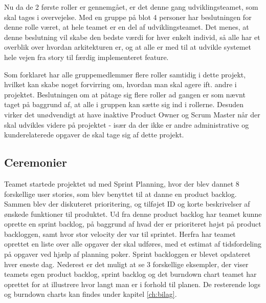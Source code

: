 Nu da de 2 første roller er gennemgået, er det denne gang udviklingsteamet, som skal tages i overvejelse. Med en gruppe på blot 4 personer har beslutningen for denne rolle været, at hele teamet er en del af udviklingsteamet. Det menes, at denne beslutning vil skabe den bedste værdi for hver enkelt individ, så alle har et overblik over hvordan arkitekturen er, og at alle er med til at udvikle systemet hele vejen fra story til færdig implementeret feature.

Som forklaret har alle gruppemedlemmer flere roller samtidig i dette projekt, hvilket kan skabe noget forvirring om, hvordan man skal agere ift. andre i projektet. Beslutningen om at påtage sig flere roller ad gangen er som nævnt taget på baggrund af, at alle i gruppen kan sætte sig ind i rollerne. Desuden virker det unødvendigt at have inaktive Product Owner og Scrum Master når der skal udvikles videre på projektet - især da der ikke er andre administrative og kunderelaterede opgaver de skal tage sig af dette projekt.

\subsection{Ceremonier}
Teamet startede projektet ud med Sprint Planning\cite{ScrumTrenches}, hvor der blev dannet 8 forskellige user stories, som blev benyttet til at danne en product backlog. Sammen blev der diskuteret prioritering, og tilføjet ID og korte beskrivelser af ønskede funktioner til produktet. Ud fra denne product backlog har teamet kunne oprette en sprint backlog, på baggrund af hvad der er prioriteret højst på product backloggen, samt hvor stor velocity der var til sprintet. Herfra har teamet oprettet en liste over alle opgaver der skal udføres, med et estimat af tidsfordeling på opgaver ved hjælp af planning poker\cite{ScrumTrenches}. Sprint backloggen er blevet opdateret hver eneste dag. Nederest er det muligt at se 3 forskellige eksempler, der viser teamets egen product backlog, sprint backlog og det burndown chart teamet har oprettet for at illustrere hvor langt man er i forhold til planen. De resterende logs og burndown charts kan findes under kapitel \ref{ch:bilag}.

